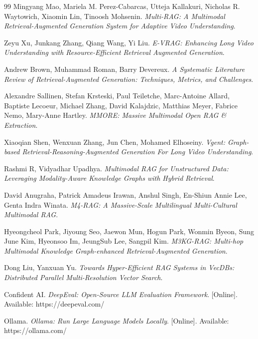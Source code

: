 \documentclass[conference]{IEEEtran}
\begin{document}
\begin{thebibliography}{99}
    Mingyang Mao, Mariela M. Perez-Cabarcas, Utteja Kallakuri, Nicholas R. Waytowich, Xiaomin Lin, Tinoosh Mohsenin.
    \textit{Multi-RAG: A Multimodal Retrieval-Augmented Generation System for Adaptive Video Understanding}.

    Zeyu Xu, Junkang Zhang, Qiang Wang, Yi Liu.
    \textit{E-VRAG: Enhancing Long Video Understanding with Resource-Efficient Retrieval Augmented Generation}.

    Andrew Brown, Muhammad Roman, Barry Devereux.
    \textit{A Systematic Literature Review of Retrieval-Augmented Generation: Techniques, Metrics, and Challenges}.

    Alexandre Sallinen, Stefan Krsteski, Paul Teiletche, Marc-Antoine Allard, Baptiste Lecoeur, Michael Zhang, David Kalajdzic, Matthias Meyer, Fabrice Nemo, Mary-Anne Hartley.
    \textit{MMORE: Massive Multimodal Open RAG \& Extraction}.

    Xiaoqian Shen, Wenxuan Zhang, Jun Chen, Mohamed Elhoseiny.
    \textit{Vgent: Graph-based Retrieval-Reasoning-Augmented Generation For Long Video Understanding}.

    Rashmi R, Vidyadhar Upadhya.
    \textit{Multimodal RAG for Unstructured Data: Leveraging Modality-Aware Knowledge Graphs with Hybrid Retrieval}.

    David Anugraha, Patrick Amadeus Irawan, Anshul Singh, En-Shiun Annie Lee, Genta Indra Winata.
    \textit{M4-RAG: A Massive-Scale Multilingual Multi-Cultural Multimodal RAG}.

    Hyeongcheol Park, Jiyoung Seo, Jaewon Mun, Hogun Park, Wonmin Byeon, Sung June Kim, Hyeonsoo Im, JeungSub Lee, Sangpil Kim.
    \textit{M3KG-RAG: Multi-hop Multimodal Knowledge Graph-enhanced Retrieval-Augmented Generation}.

    Dong Liu, Yanxuan Yu.
    \textit{Towards Hyper-Efficient RAG Systems in VecDBs: Distributed Parallel Multi-Resolution Vector Search}.

    Confident AI.
    \textit{DeepEval: Open-Source LLM Evaluation Framework}. [Online]. Available: https://deepeval.com/

    Ollama.
    \textit{Ollama: Run Large Language Models Locally}. [Online]. Available: https://ollama.com/

    \end{thebibliography}

    
\end{document}
